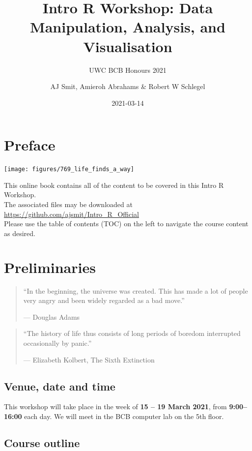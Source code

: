 \documentclass[
]{book}
\title{Intro R Workshop: Data Manipulation, Analysis, and Visualisation}
\subtitle{UWC BCB Honours 2021}
\author{AJ Smit, Amieroh Abrahams \& Robert W Schlegel}
\date{2021-03-14}
\begin{document}
\maketitle

{
\setcounter{tocdepth}{1}
\tableofcontents
}
\hypertarget{preface}{%
\chapter*{Preface}\label{preface}}

\begin{center}\texttt{[image: figures/769\_life\_finds\_a\_way]} \end{center}

This online book contains all of the content to be covered in this Intro R Workshop.\\
The associated files may be downloaded at \url{https://github.com/ajsmit/Intro_R_Official}\\
Please use the table of contents (TOC) on the left to navigate the course content as desired.

\hypertarget{prelim}{%
\chapter{Preliminaries}\label{prelim}}

\begin{quote}
``In the beginning, the universe was created. This has made a lot of people very angry and been widely regarded as a bad move.''

--- Douglas Adams
\end{quote}

\begin{quote}
``The history of life thus consists of long periods of boredom interrupted occasionally by panic.''

--- Elizabeth Kolbert, The Sixth Extinction
\end{quote}

\hypertarget{venue-date-and-time}{%
\section{Venue, date and time}\label{venue-date-and-time}}

This workshop will take place in the week of \textbf{15 -- 19 March 2021}, from \textbf{9:00--16:00} each day. We will meet in the BCB computer lab on the 5th floor.

\hypertarget{course-outline}{%
\section{Course outline}\label{course-outline}}
\end{document}
